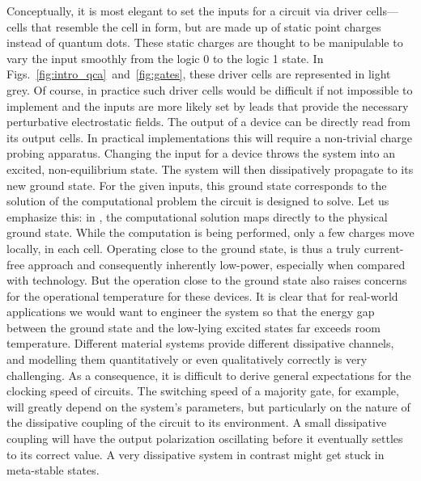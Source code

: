 Conceptually, it is most elegant to set the inputs for a  circuit via
driver cells---cells that resemble the  cell in form, but are made up
of static point charges instead of quantum dots. These static charges are
thought to be manipulable to vary the input smoothly from the logic 0 to the
logic 1 state. In Figs.~\ref{fig:intro_qca}~and~\ref{fig:gates}, these driver
cells are represented in light grey. Of course, in practice such driver cells
would be difficult if not impossible to implement and the inputs are more likely
set by leads that provide the necessary perturbative electrostatic fields. The
output of a  device can be directly read from its output cells. In
practical implementations this will require a non-trivial charge probing
apparatus. Changing the input for a  device throws the system into an
excited, non-equilibrium state. The system will then dissipatively propagate to
its new ground state. For the given inputs, this ground state corresponds to the
solution of the computational problem the circuit is designed to solve. Let us
emphasize this: in , the computational solution maps directly to the
physical ground state. While the computation is being performed, only a few
charges move locally, in each cell. Operating close to the ground state,
 is thus a truly current-free approach and consequently inherently
low-power, especially when compared with  technology. But the
operation close to the ground state also raises concerns for the operational
temperature for these devices. It is clear that for real-world applications we
would want to engineer the system so that the energy gap between the ground
state and the low-lying excited states far exceeds room temperature. Different
material systems provide different dissipative channels, and modelling them
quantitatively or even qualitatively correctly is very challenging. As a
consequence, it is difficult to derive general expectations for the clocking
speed of  circuits. The switching speed of a majority gate, for
example, will greatly depend on the system's parameters, but particularly on the
nature of the dissipative coupling of the circuit to its environment. A small
dissipative coupling will have the output polarization oscillating before it
eventually settles to its correct value. A very dissipative system in contrast
might get stuck in meta-stable states. 


